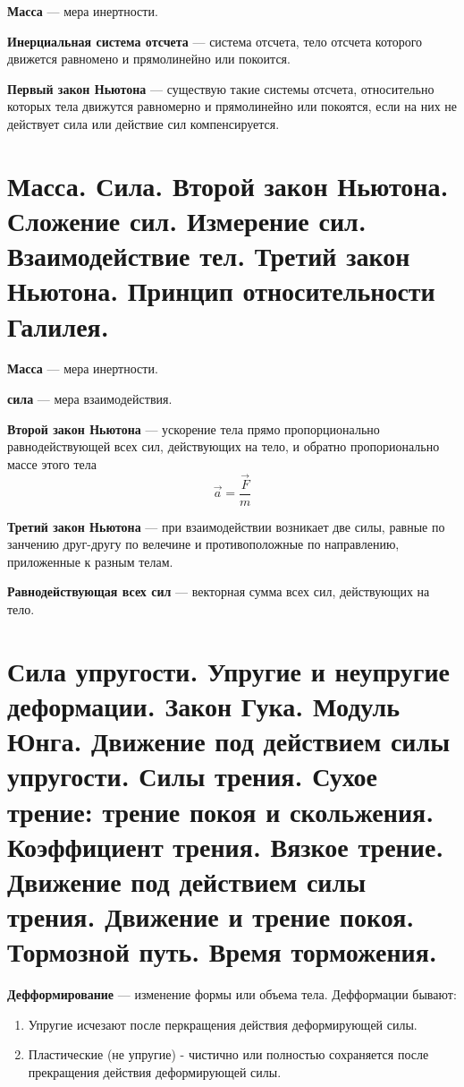 \documentclass{report}
\begin{document}
{\bf Масса} ---
мера инертности.

{\bf Инерциальная система отсчета} ---
система отсчета, тело отсчета которого движется равномено и прямолинейно или покоится.

{\bf Первый закон Ньютона} ---
существую такие системы отсчета, относительно которых тела движутся равномерно и прямолинейно или 
покоятся, если на них не действует сила или действие сил компенсируется.



\part{ Масса. 
Сила. 
Второй закон Ньютона. 
Сложение сил. 
Измерение сил. 
Взаимодействие тел. 
Третий закон Ньютона. 
Принцип относительности Галилея.}

{\bf Масса} ---
мера инертности.

{\bf сила} ---
мера взаимодействия.

{\bf Второй закон Ньютона} ---
ускорение тела прямо пропорционально равнодействующей всех сил, действующих на тело, и обратно
пропорионально массе этого тела
$$
\vec{a}=\frac{\vec{F}}{m}
$$

{\bf Третий закон Ньютона} ---
при взаимодействии возникает две силы, равные по занчению друг-другу по велечине и противоположные
по направлению, приложенные к разным телам.

{\bf Равнодействующая всех сил} ---
векторная сумма всех сил, действующих на тело.



\part{Сила упругости. 
Упругие и неупругие деформации. 
Закон Гука. 
Модуль Юнга. 
Движение под действием силы упругости. 
Силы трения. 
Сухое трение: трение покоя и скольжения. 
Коэффициент трения. 
Вязкое трение. 
Движение под действием силы трения. 
Движение и трение покоя. 
Тормозной путь. 
Время торможения.}

{\bf Дефформирование} ---
изменение формы или объема тела. Дефформации бывают:
\begin{enumerate}
  \item Упругие исчезают после перкращения действия деформирующей силы.
  \item Пластические (не упругие) - чистично или полностью сохраняется после прекращения действия 
  деформирующей силы.
\end{enumerate}
\end{document}
